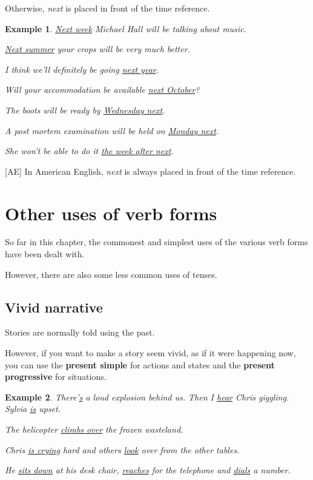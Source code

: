 \documentclass[oneside]{book}
\numberwithin{equation}{section}
\newtheorem{example}{Example}[section]
\begin{document}
Otherwise, \textit{next} is placed in front of the time reference.
\begin{example}
    \underline{Next week} Michael Hall will be talking about music.
    
    \underline{Next summer} your crops will be very much better.
    
    I think we'll definitely be going \underline{next year}.
    
    Will your accommodation be available \underline{next October}?
    
    The boots will be ready by \underline{Wednesday next}.
    
    A post mortem examination will be held on \underline{Monday next}.
    
    She won't be able to do it \underline{the week after next}.
\end{example}
[AE] In American English, \textit{next} is always placed in front of the time reference.

\section{Other uses of verb forms}
\noindent{} So far in this chapter, the commonest and simplest uses of the various verb forms have been dealt with.

However, there are also some less common uses of tenses.

\subsection{Vivid narrative}
\noindent{} Stories are normally told using the past.

However, if you want to make a story seem vivid, as if it were happening now, you can use the \textbf{present simple} for actions and states and the \textbf{present progressive} for situations.
\begin{example}
    There'\underline{s} a loud explosion behind us. Then I \underline{hear} Chris giggling. Sylvia \underline{is} upset.
    
    The helicopter \underline{climbs over} the frozen wasteland.
    
    Chris \underline{is crying} hard and others \underline{look} over from the other tables.
    
    He \underline{sits down} at his desk chair, \underline{reaches} for the telephone and \underline{dials} a number.
\end{example}
\end{document}
